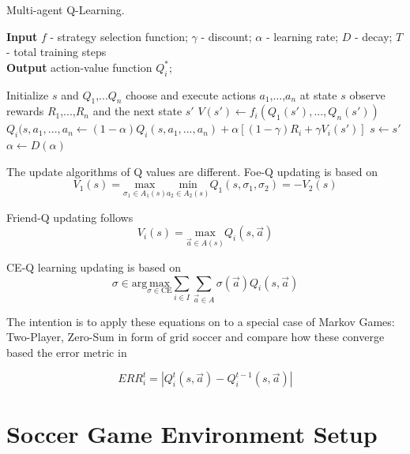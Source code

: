 \documentclass[conference]{IEEEtran}
\begin{document}
\begin{algorithm}[htb] 
\caption{Multi-agent Q-Learning.} 
\textbf{Input} $f$ - strategy selection function; $\gamma$ - discount; $\alpha$ - learning rate; $D$ - decay; $T$ - total training steps\\
\textbf{Output} action-value function $Q_i^*$;
\begin{algorithmic}[1]\label{al:multiagentQ}
\STATE Initialize $s$ and $Q_1$,...$Q_n$
\STATE choose and execute actions $a_1$,...,$a_n$ at state $s$
\STATE observe rewards $R_1$,...,$R_n$ and the next state $s'$
       \STATE $V(s') \leftarrow f_i(Q_1(s'),...,Q_n(s'))$
       \STATE $Q_i(s,a_1,...,a_n \leftarrow (1-\alpha)Q_i(s,a_1,...,a_n)+\alpha[(1-\gamma)R_i + \gamma V_i(s')]$ 
       \ENDFOR
\ENDFOR
\STATE $s \leftarrow s'$
\STATE $\alpha \leftarrow D(\alpha)$
\end{algorithmic}
\end{algorithm}


The update algorithms of Q values are different. Foe-Q updating is based on 
\begin{equation}\label{eq:foe}
V_1(s) = \underset{\sigma_1\in A_1(s)}{\text{max}}\underset{a_2\in A_2(s)}{\text{min}}Q_1(s,\sigma_1,\sigma_2) = -V_2(s)
\end{equation}

Friend-Q updating follows 
\begin{equation}\label{eq:friend}
V_i(s) = \underset{\vec{a}\in A(s)}{\text{max}} Q_i(s,\vec{a})
\end{equation}

CE-Q learning updating is based on 
\begin{equation}\label{eq:ceq}
\sigma \in \text{arg}\underset{\sigma \in \text{CE}}{\text{max}} \sum_{i \in I} \sum_{\vec{a} \in A} \sigma(\vec{a})Q_i(s,\vec{a})
\end{equation}

The intention is to apply these equations on to a special case of Markov Games: Two-Player, Zero-Sum in form of grid soccer and compare how these converge based the error metric in 

\begin{equation}\label{equ:err}
ERR_i^t = |Q_i^t(s,\vec{a}) - Q_i^{t-1}(s,\vec{a})|
\end{equation}

\section{Soccer Game Environment Setup}
\end{document}
